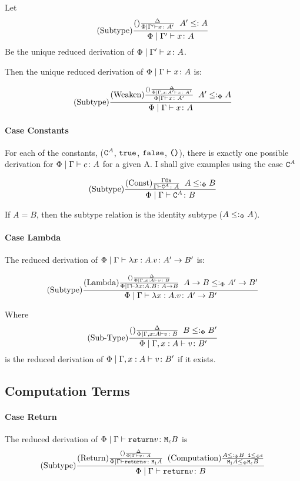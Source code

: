 \documentclass{report}
\newcommand\edeltavrule[5]{\deltavrule{#1 \mid #2}{#3}{#4}{#5}}
\begin{document}
Let 
\begin{equation}
    \edeltavrule{\P}{\G'}{x}{A'}{A}
\end{equation}
Be the  unique reduced derivation of $\Phi\mid\Gamma' \vdash x \colon A$.

Then the unique reduced derivation of $\Phi\mid\Gamma \vdash x \colon A$ is:


\begin{equation}
    (\text{Subtype}) \frac{
        (\text{Weaken}) \frac{
            (\text{}) \frac{\Delta}{\Phi\mid\Gamma, x: A' \vdash x \colon A'}
        }{\Phi\mid\Gamma \vdash x \colon A'}   
    \;\; A' \leq:_\Phi A
    }{\Phi\mid\Gamma \vdash x \colon A}
\end{equation}

\paragraph{Case Constants}
For each of the constants, ($\texttt{C}^{A}$, $\texttt{true}$, $\texttt{false}$, $\texttt{()}$), there is exactly one possible derivation for $\Phi\mid\Gamma \vdash c \colon A$ for a given A. I shall give examples using the case $\texttt{C}^{A}$


$$
    (\text{Subtype}) \frac{(\text{Const}) \frac{\Gamma \texttt{Ok}}{\Gamma \vdash \texttt{C}^{A} \colon A}\;\; A \leq:_\Phi B}{\Phi\mid\Gamma \vdash \texttt{C}^{A} \colon B}
$$

If $A = B$, then the subtype relation is the identity subtype ($A \leq:_\Phi A$).



\paragraph{Case Lambda}
The reduced derivation of $\Phi\mid\Gamma \vdash \lambda x : A. v \colon A'\rightarrow B'$ is:


$$
(\text{Subtype}) \frac{(\text{Lambda}) \frac{(\text{}) \frac{\Delta}{\Phi\mid\Gamma, x: A \vdash v \colon B}}{
    \Phi\mid\Gamma \vdash \lambda x : A. B \colon A\rightarrow B}
    \;\;
    A\rightarrow B \leq:_\Phi A'\rightarrow B'
}{
   \Phi\mid\Gamma \vdash \lambda x : A. v \colon A'\rightarrow B' 
}
$$

Where 
\begin{equation}
    (\text{Sub-Type}) \frac{(\text{}) \frac{\Delta}{\Phi\mid\Gamma, x: A \vdash v \colon B}\;\; B\leq:_\Phi B'}{\Phi\mid\Gamma, x: A \vdash v \colon B'}
\end{equation}
is the reduced derivation of $\Phi\mid\Gamma, x: A \vdash v \colon B'$ if it exists.

\subsection{Computation Terms}
\paragraph{Case Return}
The reduced derivation of $\Phi\mid\Gamma \vdash \texttt{return} v \colon \texttt{M}_{\epsilon}{B}$ is 
$$
    (\text{Subtype}) \frac{
        (\text{Return}) \frac{(\text{}) \frac{\Delta}{\Phi\mid\Gamma \vdash v \colon A}}{\Phi\mid\Gamma \vdash \texttt{return} v \colon \texttt{M}_{\texttt{1}}{A}}
        \;\;
        (\text{Computation}) \frac{            
            A \leq:_\Phi B
        \;\;
        \texttt{1} \leq_{\Phi} \epsilon}{\texttt{M}_{\texttt{1}}{A}\leq_{\Phi}\texttt{M}_{\epsilon}{B}}
    }{\Phi\mid\Gamma \vdash \texttt{return} v \colon B}
$$
\end{document}
